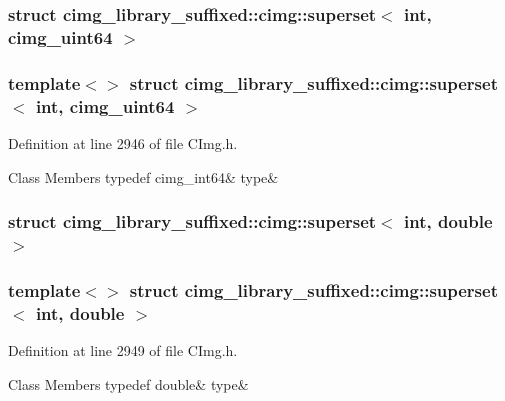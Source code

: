 \subsubsection{struct cimg\+\_\+library\+\_\+suffixed\+:\+:cimg\+:\+:superset$<$ int, cimg\+\_\+uint64 $>$}
\subsubsection*{template$<$$>$\newline
struct cimg\+\_\+library\+\_\+suffixed\+::cimg\+::superset$<$ int, cimg\+\_\+uint64 $>$}



Definition at line 2946 of file C\+Img.\+h.

\begin{DoxyFields}{Class Members}
\mbox{\label{namespacecimg__library__suffixed_1_1cimg_a8eec20c2a9229911c7ef9a8a5668a761}} 
typedef cimg\_int64&
type&
\\
\hline

\end{DoxyFields}
\label{structcimg__library__suffixed_1_1cimg_1_1superset_3_01int_00_01double_01_4}
\subsubsection{struct cimg\+\_\+library\+\_\+suffixed\+:\+:cimg\+:\+:superset$<$ int, double $>$}
\subsubsection*{template$<$$>$\newline
struct cimg\+\_\+library\+\_\+suffixed\+::cimg\+::superset$<$ int, double $>$}



Definition at line 2949 of file C\+Img.\+h.

\begin{DoxyFields}{Class Members}
\mbox{\label{namespacecimg__library__suffixed_1_1cimg_a4e469080a7f9c9f8cc8a1c346e36534f}} 
typedef double&
type&
\\
\hline

\end{DoxyFields}
\label{structcimg__library__suffixed_1_1cimg_1_1superset_3_01int_00_01float_01_4}

